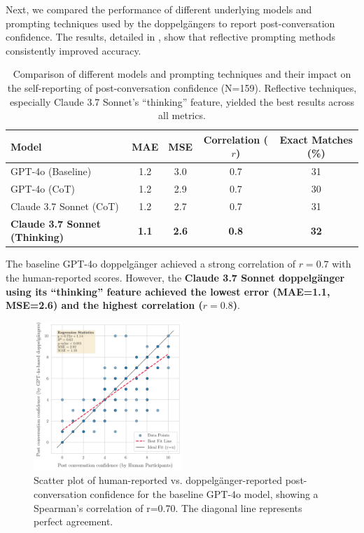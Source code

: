 Next, we compared the performance of different underlying models and prompting techniques used by the doppelgängers to report post-conversation confidence. The results, detailed in , show that reflective prompting methods consistently improved accuracy.


\begin{table}[!ht]
\centering
\begin{tabular}{l|cccc}
\toprule
\textbf{Model} & \textbf{MAE} & \textbf{MSE} & \textbf{Correlation ($r$)} & \textbf{Exact Matches (\%)} \\
\midrule
GPT-4o (Baseline) & 1.2 & 3.0 & 0.7 & 31
\\
GPT-4o (CoT) & 1.2 & 2.9 & 0.7 & 30 \\
Claude 3.7 Sonnet (CoT) & 1.2 & 2.7 & 0.7 & 31 \\
\textbf{Claude 3.7 Sonnet (Thinking)} & \textbf{1.1} & \textbf{2.6} & \textbf{0.8} & \textbf{32} \\ 
\bottomrule
\end{tabular}
\caption[Effect of LLM type and reasoning on synthetic smokers' self-reported confidence.]{Comparison of different models and prompting techniques and their impact on the self-reporting of post-conversation confidence (N=159). Reflective techniques, especially Claude 3.7 Sonnet's ``thinking'' feature, yielded the best results across all metrics.}
\label{tab:model_comparison}
\end{table}

The baseline GPT-4o doppelgänger achieved a strong correlation of \textbf{$r=0.7$} with the human-reported scores. However, the \textbf{Claude 3.7 Sonnet doppelgänger using its ``thinking'' feature achieved the lowest error (MAE=1.1, MSE=2.6) and the highest correlation ($r=0.8$)}.


\begin{figure}[htpb]
    \centering
    \includegraphics[width=0.5\textwidth]{fig/post_conf_gpt4o_vs_human.png}
    \caption{Scatter plot of human-reported vs. doppelgänger-reported post-conversation confidence for the baseline GPT-4o model, showing a Spearman's correlation of r=0.70. The diagonal line represents perfect agreement.}
    \label{fig:post-conf-gpt4o-vs-human}
\end{figure}


